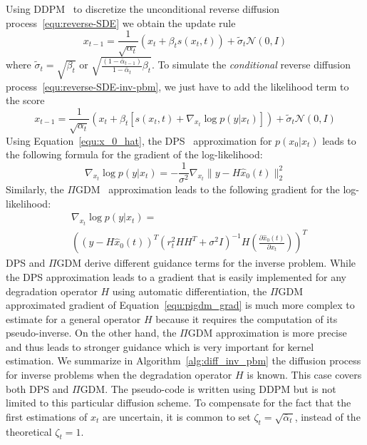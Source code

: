 \documentclass[10pt,twocolumn,letterpaper]{article}
\newcommand{\xZeroHat}{\ensuremath{\widehat{x}_0(t)}}
\begin{document}
%
Using DDPM~\cite{ho_denoising_2020} to discretize the unconditional reverse diffusion process~\eqref{equ:reverse-SDE} we obtain the update rule
\begin{equation}\label{eq:DDPM-update}
    x_{t-1} = \frac{1}{\sqrt{\alpha_t}}\left( x_t + \beta_t s(x_t, t)\right) + \tilde{\sigma}_t \mathcal{N}(0,I)
\end{equation}
where $ \tilde{\sigma}_t = \sqrt{\beta_t} \text{ or } \sqrt{\frac{(1-\bar\alpha_{t-1})}{1-\bar{\alpha}_t}\beta_t}$. To simulate the \emph{conditional} reverse diffusion process~\eqref{equ:reverse-SDE-inv-pbm}, we just have to add the likelihood term to the score
\begin{dmath}\label{eq:conditional-DDPM-update}
    x_{t-1} = \frac{1}{\sqrt{\alpha_t}}\left( x_t + \beta_t \left[s(x_t, t) + \nabla_{x_t} \log p(y|x_t)\right] \right) + \tilde{\sigma}_t \mathcal{N}(0,I) 
\end{dmath}
%
Using Equation~\eqref{equ:x_0_hat}, the DPS~\cite{chung_diffusion_2023} approximation for $p(x_0|x_t)$ leads to the following formula for the gradient of the log-likelihood:
%
\begin{equation}
    \label{equ:dps_grad}
    \nabla_{x_t} \log p(y|x_t) = -\frac{1}{\sigma^2}\nabla_{x_t} \|y - H\xZeroHat\|_2^2
\end{equation}
%
Similarly, the $\Pi$GDM~\cite{song_pseudoinverse-guided_2023} approximation leads to the following gradient for the log-likelihood:
%
\begin{align}
    \label{equ:pigdm_grad}
    & \nabla_{x_t} \log p(y|x_t) = \\
    & \left((y - H\xZeroHat)^T(r_t^2 H H^T + \sigma^2 I)^{-1}H \left(\frac{\partial \xZeroHat}{\partial x_t}\right) \right)^T \nonumber
\end{align}
%
%
DPS and $\Pi$GDM derive different guidance terms for the inverse problem. While the DPS approximation leads to a gradient that is easily implemented for any degradation operator $H$ using automatic differentiation, the $\Pi$GDM approximated gradient of Equation~\eqref{equ:pigdm_grad} is much more complex to estimate for a general operator $H$ because it requires the computation of its pseudo-inverse. 
%
On the other hand, the $\Pi$GDM approximation is more precise and thus leads to stronger guidance which is very important for kernel estimation. 
%
We summarize in Algorithm~\ref{alg:diff_inv_pbm} the diffusion process for inverse problems when the degradation operator $H$ is known. This case covers both DPS and $\Pi$GDM. The pseudo-code is written using DDPM but is not limited to this particular diffusion scheme. 
%
To compensate for the fact that the first estimations of $x_t$ are uncertain, it is common to set $\zeta_t = \sqrt{\bar{\alpha}_t}$, instead of the theoretical $\zeta_t=1$.
%
\end{document}
